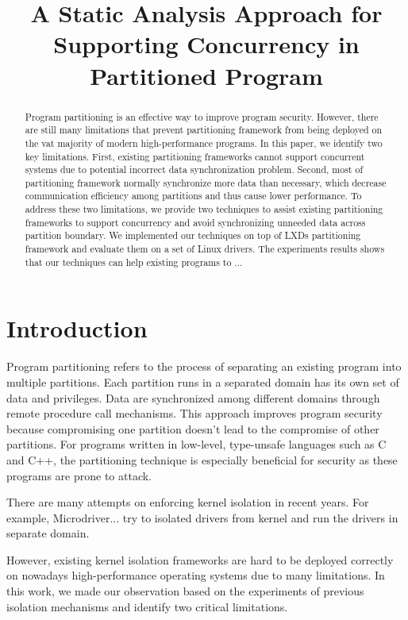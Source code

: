 \documentclass[pageno]{jpaper}
\begin{document}
\title{A Static Analysis Approach for Supporting Concurrency in Partitioned Program}

\date{}
\maketitle
\thispagestyle{empty}

\begin{abstract} 
  Program partitioning is an effective way to improve program security. However, there are still many limitations that prevent partitioning framework from being deployed on the vat majority of modern high-performance programs. In this paper, we identify two key limitations. First, existing partitioning frameworks cannot support concurrent systems due to potential incorrect data synchronization problem. Second, most of partitioning framework normally synchronize more data than necessary, which decrease communication efficiency among partitions and thus cause lower performance. To address these two limitations, we provide two techniques to assist existing partitioning frameworks to support concurrency and avoid synchronizing unneeded data across partition boundary. We implemented our techniques on top of LXDs partitioning framework and evaluate them on a set of Linux drivers. The experiments results shows that our techniques can help existing programs to ...
\end{abstract}

\section{Introduction}
Program partitioning refers to the process of separating an existing program into multiple partitions. Each partition runs in a separated domain has its own set of data and privileges. Data are synchronized among different domains through remote procedure call mechanisms. This approach improves program security because compromising one partition doesn't lead to the compromise of other partitions. For programs written in low-level, type-unsafe languages such as C and C++, the partitioning technique is especially beneficial for security as these programs are prone to attack.

There are many attempts on enforcing kernel isolation in recent years. For example, Microdriver... try to isolated drivers from kernel and run the drivers in separate domain. 

However, existing kernel isolation frameworks are hard to be deployed correctly on nowadays high-performance operating systems due to many limitations. In this work, we made our observation based on the experiments of previous isolation mechanisms and identify two critical limitations. 
\end{document}
